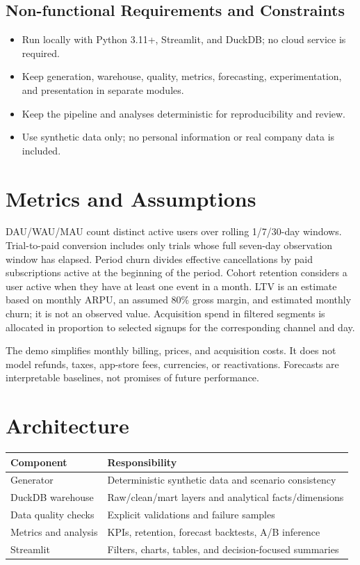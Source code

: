 \documentclass[a4paper,11pt]{article}
\begin{document}
\subsection{Non-functional Requirements and Constraints}
\begin{itemize}
  \item Run locally with Python 3.11+, Streamlit, and DuckDB; no cloud service is required.
  \item Keep generation, warehouse, quality, metrics, forecasting, experimentation, and presentation in separate modules.
  \item Keep the pipeline and analyses deterministic for reproducibility and review.
  \item Use synthetic data only; no personal information or real company data is included.
\end{itemize}

\section{Metrics and Assumptions}
DAU/WAU/MAU count distinct active users over rolling 1/7/30-day windows. Trial-to-paid conversion includes only trials whose full seven-day observation window has elapsed. Period churn divides effective cancellations by paid subscriptions active at the beginning of the period. Cohort retention considers a user active when they have at least one event in a month. LTV is an estimate based on monthly ARPU, an assumed 80\% gross margin, and estimated monthly churn; it is not an observed value. Acquisition spend in filtered segments is allocated in proportion to selected signups for the corresponding channel and day.

The demo simplifies monthly billing, prices, and acquisition costs. It does not model refunds, taxes, app-store fees, currencies, or reactivations. Forecasts are interpretable baselines, not promises of future performance.

\section{Architecture}
\begin{center}
\begin{tabular}{ll}
\toprule
Component & Responsibility \\
\midrule
Generator & Deterministic synthetic data and scenario consistency \\
DuckDB warehouse & Raw/clean/mart layers and analytical facts/dimensions \\
Data quality checks & Explicit validations and failure samples \\
Metrics and analysis & KPIs, retention, forecast backtests, A/B inference \\
Streamlit & Filters, charts, tables, and decision-focused summaries \\
\bottomrule
\end{tabular}
\end{center}
\end{document}
